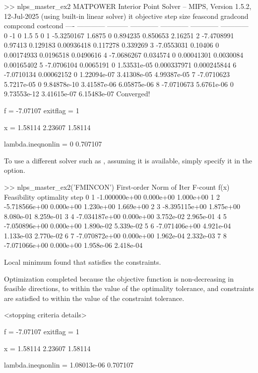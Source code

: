 \documentclass[12pt]{article}
\newcommand{\code}[1]{{\relsize{-0.5}{\tt{{#1}}}}}  %
\numberwithin{equation}{section}
\numberwithin{table}{section}
\numberwithin{figure}{section}
\begin{document}
\begin{Code}
>> nlps_master_ex2
MATPOWER Interior Point Solver -- MIPS, Version 1.5.2, 12-Jul-2025
 (using built-in linear solver)
 it    objective   step size   feascond     gradcond     compcond     costcond  
----  ------------ --------- ------------ ------------ ------------ ------------
  0            -1                       0          1.5            5            0
  1    -5.3250167     1.6875            0     0.894235     0.850653      2.16251
  2    -7.4708991    0.97413     0.129183   0.00936418     0.117278     0.339269
  3    -7.0553031    0.10406            0   0.00174933    0.0196518    0.0490616
  4    -7.0686267   0.034574            0   0.00041301    0.0030084   0.00165402
  5    -7.0706104  0.0065191            0  1.53531e-05  0.000337971  0.000245844
  6    -7.0710134 0.00062152            0  1.22094e-07  3.41308e-05  4.99387e-05
  7    -7.0710623 5.7217e-05            0  9.84878e-10  3.41587e-06  6.05875e-06
  8    -7.0710673 5.6761e-06            0  9.73553e-12  3.41615e-07  6.15483e-07
Converged!

f = -7.07107   exitflag = 1

x = 
   1.58114
   2.23607
   1.58114

lambda.ineqnonlin =
   0
   0.707107
\end{Code}
To use a different solver such as \code{fmincon}, assuming it is available, simply specify it in the \code{alg} option.
\begin{Code}
>> nlps_master_ex2('FMINCON')
                                            First-order      Norm of
 Iter F-count            f(x)  Feasibility   optimality         step
    0       1   -1.000000e+00    0.000e+00    1.000e+00
    1       2   -5.718566e+00    0.000e+00    1.230e+00    1.669e+00
    2       3   -8.395115e+00    1.875e+00    8.080e-01    8.259e-01
    3       4   -7.034187e+00    0.000e+00    3.752e-02    2.965e-01
    4       5   -7.050896e+00    0.000e+00    1.890e-02    5.339e-02
    5       6   -7.071406e+00    4.921e-04    1.133e-03    2.770e-02
    6       7   -7.070872e+00    0.000e+00    1.962e-04    2.332e-03
    7       8   -7.071066e+00    0.000e+00    1.958e-06    2.418e-04

Local minimum found that satisfies the constraints.

Optimization completed because the objective function is non-decreasing in 
feasible directions, to within the value of the optimality tolerance,
and constraints are satisfied to within the value of the constraint tolerance.

<stopping criteria details>

f = -7.07107   exitflag = 1

x = 
   1.58114
   2.23607
   1.58114

lambda.ineqnonlin =
   1.08013e-06
   0.707107
\end{Code}
\end{document}
